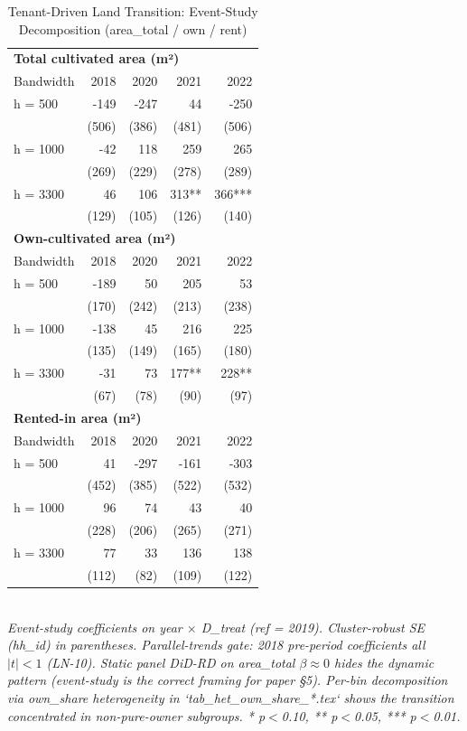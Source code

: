 \begin{table}[t]
\centering
\caption{Tenant-Driven Land Transition: Event-Study Decomposition (area\_total / own / rent)}
\label{tab:stabilization_en}
\begin{tabular}{lrrrr}
\toprule
\multicolumn{5}{l}{\textbf{Total cultivated area (m²)}} \\
Bandwidth & 2018 & 2020 & 2021 & 2022 \\
\midrule
h = 500 & -149 & -247 & 44 & -250 \\
    & (506) & (386) & (481) & (506) \\
h = 1000 & -42 & 118 & 259 & 265 \\
    & (269) & (229) & (278) & (289) \\
h = 3300 & 46 & 106 & 313** & 366*** \\
    & (129) & (105) & (126) & (140) \\
\midrule
\multicolumn{5}{l}{\textbf{Own-cultivated area (m²)}} \\
Bandwidth & 2018 & 2020 & 2021 & 2022 \\
\midrule
h = 500 & -189 & 50 & 205 & 53 \\
    & (170) & (242) & (213) & (238) \\
h = 1000 & -138 & 45 & 216 & 225 \\
    & (135) & (149) & (165) & (180) \\
h = 3300 & -31 & 73 & 177** & 228** \\
    & (67) & (78) & (90) & (97) \\
\midrule
\multicolumn{5}{l}{\textbf{Rented-in area (m²)}} \\
Bandwidth & 2018 & 2020 & 2021 & 2022 \\
\midrule
h = 500 & 41 & -297 & -161 & -303 \\
    & (452) & (385) & (522) & (532) \\
h = 1000 & 96 & 74 & 43 & 40 \\
    & (228) & (206) & (265) & (271) \\
h = 3300 & 77 & 33 & 136 & 138 \\
    & (112) & (82) & (109) & (122) \\
\midrule
\bottomrule
\end{tabular}
\\
\footnotesize\textit{Event-study coefficients on year $\times$ D\_treat (ref = 2019). Cluster-robust SE (hh\_id) in parentheses. Parallel-trends gate: 2018 pre-period coefficients all $|t|<1$ (LN-10). Static panel DiD-RD on area\_total $\beta \approx 0$ hides the dynamic pattern (event-study is the correct framing for paper \S5). Per-bin decomposition via own\_share heterogeneity in `tab_het_own_share_*.tex` shows the transition concentrated in non-pure-owner subgroups. * p$<$0.10, ** p$<$0.05, *** p$<$0.01.}
\end{table}

